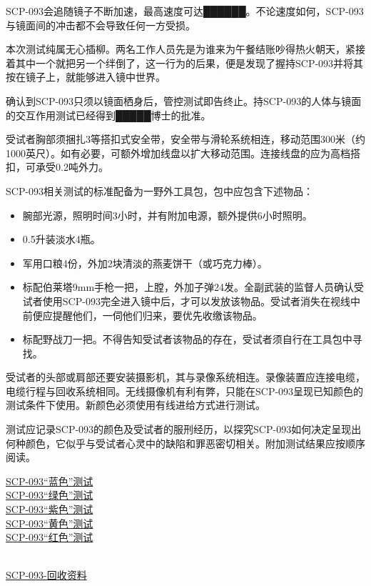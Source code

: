 SCP-093会追随镜子不断加速，最高速度可达██████。不论速度如何，SCP-093与镜面间的冲击都不会导致任何一方受损。

本次测试纯属无心插柳。两名工作人员先是为谁来为午餐结账吵得热火朝天，紧接着其中一个就把另一个绊倒了，这一行为的后果，便是发现了握持SCP-093并将其按在镜子上，就能够进入镜中世界。

确认到SCP-093只须以镜面栖身后，管控测试即告终止。持SCP-093的人体与镜面的交互作用测试已经得到█████博士的批准。

\begin{scpdialog}
\end{scpdialog}

受试者胸部须捆扎3等搭扣式安全带，安全带与滑轮系统相连，移动范围300米（约1000英尺）。如有必要，可额外增加线盘以扩大移动范围。连接线盘的应为高档搭扣，可承受0.2吨外力。

SCP-093相关测试的标准配备为一野外工具包，包中应包含下述物品：

\begin{itemize}
\item 腕部光源，照明时间3小时，并有附加电源，额外提供6小时照明。
\item 0.5升装淡水4瓶。
\item 军用口粮4份，外加2块清淡的燕麦饼干（或巧克力棒）。
\item 标配伯莱塔9mm手枪一把，上膛，外加子弹24发。全副武装的监督人员确认受试者使用SCP-093完全进入镜中后，才可以发放该物品。受试者消失在视线中前便应提醒他们，一伺他们归来，要优先收缴该物品。
\item 标配野战刀一把。不得告知受试者该物品的存在，受试者须自行在工具包中寻找。
\end{itemize}

受试者的头部或肩部还要安装摄影机，其与录像系统相连。录像装置应连接电缆，电缆行程与回收系统相同。无线摄像机有利有弊，只能在SCP-093呈现已知颜色的测试条件下使用。新颜色必须使用有线进给方式进行测试。

测试应记录SCP-093的颜色及受试者的服刑经历，以探究SCP-093如何决定呈现出何种颜色，它似乎与受试者心灵中的缺陷和罪恶密切相关。附加测试结果应按顺序阅读。

\hyperref[sec:DOC-scp-093-blue-test]{SCP-093“蓝色”测试}\\
\hyperref[sec:DOC-scp-093-green-test]{SCP-093“绿色”测试}\\
\hyperref[sec:DOC-scp-093-violet-test]{SCP-093“紫色”测试}\\
\hyperref[sec:DOC-scp-093-yellow-test]{SCP-093“黄色”测试}\\
\hyperref[sec:DOC-scp-093-red-test]{SCP-093“红色”测试}

\hr

\\
\hyperref[sec:DOC-scp-093-recovered-materials]{SCP-093-回收资料}







